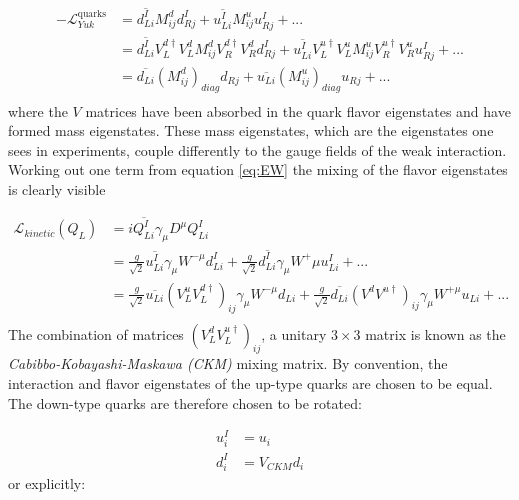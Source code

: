 \begin{equation}
\begin{split}
-\mathcal{L}^{\textrm{quarks}}_{Yuk} &= \overline{d^I_{Li}} M^d_{ij} d^I_{Rj} + \overline{u^I_{Li}} M^u_{ij} u^I_{Rj} + ...\\
&= \overline{d^I_{Li}} V^{d\dagger}_L V^d_L M^d_{ij} V^{d\dagger}_R V^{d}_R d^I_{Rj} + \overline{u^I_{Li}} V^{u\dagger}_L V^u_L M^u_{ij} V^{u\dagger}_R V^u_R u^I_{Rj} + ...\\
&= \overline{d_{Li}} \left(M^d_{ij}\right)_{diag} d_{Rj} + \overline{u_{Li}} \left(M^u_{ij}\right)_{diag} u_{Rj} + ... \\
\end{split}
\end{equation}
where the $V$ matrices have been absorbed in the quark flavor eigenstates and have formed mass eigenstates. These mass eigenstates, which are the eigenstates one sees in experiments, couple differently to the gauge fields of the weak interaction. Working out one term from equation \ref{eq:EW} the mixing of the flavor eigenstates is clearly visible

\begin{equation}
\begin{split}
\mathcal{L}_{kinetic}\left(Q_L\right) &= i\overline{Q^I_{Li}}\gamma_\mu D^\mu Q^I_{Li} \\
&= \frac{g}{\sqrt{2}}\overline{u^I_{Li}} \gamma_\mu W^{-\mu} d^I_{Li} + \frac{g}{\sqrt{2}} \overline{d^I_{Li}} \gamma_\mu W^+\mu u^I_{Li} + ...\\
&= \frac{g}{\sqrt{2}}\overline{u_{Li}} \left(V^u_L V^{d\dagger}_L\right)_{ij} \gamma_\mu W^{-\mu} d_{Li} + \frac{g}{\sqrt{2}} \overline{d_{Li}} \left(V^d V^{u\dagger}\right)_{ij} \gamma_\mu W^{+\mu} u_{Li} + ...\\
\end{split}
\end{equation}
The combination of matrices $\left(V^d_L V^{u\dagger}_L\right)_{ij}$, a unitary $3 \times 3$ matrix is known as the \textit{Cabibbo-Kobayashi-Maskawa (CKM)} mixing matrix. By convention, the interaction and flavor eigenstates of the up-type quarks are chosen to be equal. The down-type quarks are therefore chosen to be rotated:

\begin{equation}
\begin{split}
u^I_i &= u_i\\
d^I_i &= V_{CKM} d_i
\end{split}
\end{equation}
or explicitly:


